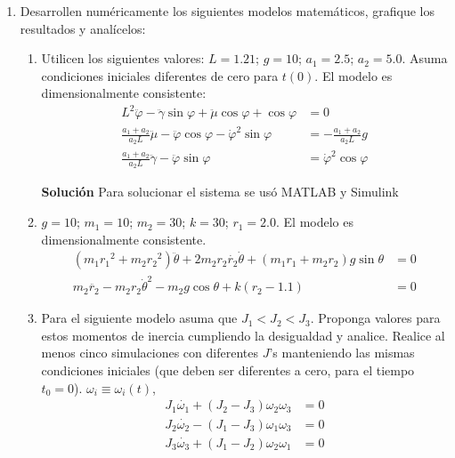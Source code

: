 \documentclass[letterpaper, 12pt]{article}
\begin{document}
\begin{enumerate}
\item Desarrollen numéricamente los siguientes modelos matemáticos, grafique los resultados y analícelos:
\begin{enumerate}
\item Utilicen los siguientes valores:
$L = 1.21$; $g = 10$; $a_1 = 2.5$; $a_2 = 5.0$. Asuma condiciones iniciales diferentes de cero para $t(0)$. El modelo es dimensionalmente consistente:
\begin{equation}
\begin{split}
    L^2\ddot{\varphi} - \ddot{\gamma}\sin \varphi + \ddot{\mu}\cos \varphi + \cos \varphi &= 0 \\
    \frac{a_1+a_2}{a_2L}\ddot{\mu} - \ddot{\varphi}\cos \varphi - \dot{\varphi}^2\sin \varphi &= - \frac{a_1+a_2}{a_2L}g \\
    \frac{a_1+a_2}{a_2L}\ddot{\gamma} - \ddot{\varphi}\sin \varphi &= \dot{\varphi}^2\cos \varphi
\end{split}
\end{equation}

\textbf{Solución}
Para solucionar el sistema se usó MATLAB y Simulink








\item $g = 10$; $m_1 = 10$; $m_2 = 30$; $k = 30$; $r_1 = 2.0$. El modelo es dimensionalmente consistente.
\begin{equation}
\begin{split}
    \left(m_1{r_1}^2 + m_2{r_2}^2\right)\ddot{\theta} + 2m_2r_2\dot{r_2}\dot{\theta} + \left(m_1r_1 + m_2r_2\right)g\sin \theta &= 0 \\
    m_2\ddot{r_2} - m_2r_2{\dot{\theta}}^2 - m_2g\cos \theta + k\left(r_2 - 1.1\right) &= 0
\end{split}
\end{equation}









\item Para el siguiente modelo asuma que $J_1 < J_2 < J_3$. Proponga valores para estos momentos de inercia cumpliendo la desigualdad y analice. Realice al menos cinco simulaciones con diferentes $J$'s manteniendo las mismas condiciones iniciales (que deben ser diferentes a cero, para el tiempo $t_0 = 0$). $\omega_i \equiv \omega_i(t)$,
\begin{equation}
\begin{split}
    J_1\dot{\omega_1} + \left( J_2 - J_3\right)\omega_2\omega_3 &= 0 \\
    J_2\dot{\omega_2} - \left( J_1 - J_3\right)\omega_1\omega_3 &= 0 \\
    J_3\dot{\omega_3} + \left( J_1 - J_2\right)\omega_2\omega_1 &= 0
\end{split}
\end{equation}


\end{enumerate}
\end{enumerate}
\end{document}
